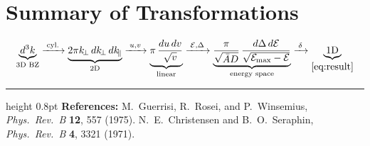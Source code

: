 \documentclass[11pt,a4paper]{article}
\newcommand{\E}{\mathcal{E}}              %
\newcommand{\Emax}{\E_{\max}}
\newcommand{\Abar}{\bar{A}}
\newcommand{\kperp}{k_{\!\perp}}
\newcommand{\kpar}{k_{\!\parallel}}
\begin{document}
\section*{Summary of Transformations}

\begin{equation*}
  \underbrace{d^3k}_{\text{3D BZ}}
  \xrightarrow{\;\text{cyl.}\;}
  \underbrace{2\pi\kperp\,d\kperp\,d\kpar}_{\text{2D}}
  \xrightarrow{\;u,v\;}
  \underbrace{\pi\,\frac{du\,dv}{\sqrt{v}}}_{\text{linear}}
  \xrightarrow{\;\E,\Delta\;}
  \underbrace{\frac{\pi}{\sqrt{\Abar D}}\,
  \frac{d\Delta\,d\E}{\sqrt{\Emax-\E}}}_{\text{energy space}}
  \xrightarrow{\;\delta\;}
  \underbrace{\text{1D}}_{\eqref{eq:result}}
\end{equation*}

\vfill
\hrule height 0.8pt
\smallskip
{\footnotesize
\textbf{References:}
M.~Guerrisi, R.~Rosei, and P.~Winsemius, \textit{Phys.\ Rev.\ B} \textbf{12}, 557 (1975).\;
N.~E.~Christensen and B.~O.~Seraphin, \textit{Phys.\ Rev.\ B} \textbf{4}, 3321 (1971).
}
\end{document}
